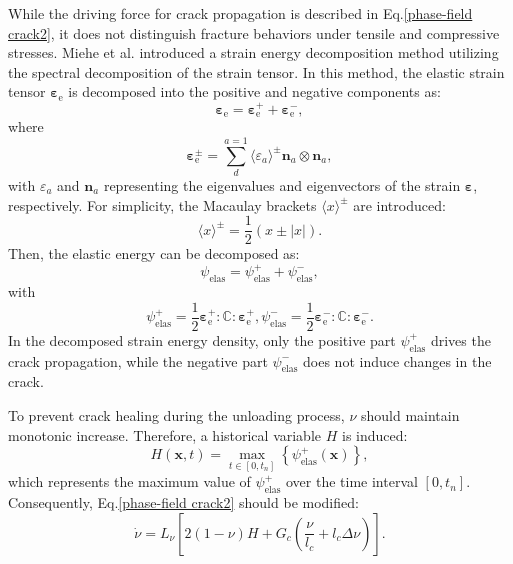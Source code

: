 \documentclass[times,fleqn,11pt]{elsarticle}
\begin{document}
While the driving force for crack propagation is described in Eq.\eqref{phase-field crack2}, it does not distinguish fracture behaviors under tensile and compressive stresses. Miehe et al. \cite{miehe_thermodynamically_2010} introduced a strain energy decomposition method utilizing the spectral decomposition of the strain tensor. In this method, the elastic strain tensor $\mathbf{\varepsilon}_\mathrm{e}$ is decomposed into the positive and negative components as:
\begin{equation}
    \mathbf{\varepsilon}_\mathrm{e}=\mathbf{\varepsilon}^+_\mathrm{e} + \mathbf{\varepsilon}^-_\mathrm{e}  ,
\end{equation}
where 
\begin{equation}
    \mathbf{\varepsilon}_\mathrm{e}^\pm=\sum_{d}^{a=1}\langle \varepsilon_a\rangle^\pm \mathbf{n}_a\otimes\mathbf{n}_a,
\end{equation}
with $\varepsilon_a$ and $\mathbf{n}_a$ representing the eigenvalues and eigenvectors of the strain $\mathbf{\varepsilon}$, respectively. For simplicity, the Macaulay brackets $\langle x \rangle^\pm$ are introduced: 
\begin{equation}
    \langle x \rangle^\pm = \frac{1}{2}(x\pm |x|).
\end{equation}
Then, the elastic energy can be decomposed as:
\begin{equation}
    \psi_\mathrm{elas}=\psi_\mathrm{elas}^++\psi_\mathrm{elas}^-,
\end{equation}
with 
\begin{subequations}
    \begin{equation}
        \psi^+_\mathrm{elas}=\frac{1}{2}\mathbf{\varepsilon}_\mathrm{e}^+ : \mathbb{C} : \mathbf{\varepsilon}_\mathrm{e}^+,
    \end{equation}
    \begin{equation}
        \psi^-_\mathrm{elas}=\frac{1}{2}\mathbf{\varepsilon}_\mathrm{e}^- : \mathbb{C} : \mathbf{\varepsilon}_\mathrm{e}^-.
    \end{equation}
\end{subequations}
In the decomposed strain energy density, only the positive part $\psi^+_\mathrm{elas}$ drives the crack propagation, while the negative part $\psi^-_\mathrm{elas}$ does not induce changes in the crack. 

To prevent crack healing during the unloading process, $\nu$ should maintain monotonic increase. Therefore, a historical variable $H$ is induced:
\begin{equation}
    H(\mathbf{x},t)=\max_{t\in [0,t_n]} \left\{  \psi^+_\mathrm{elas}(\mathbf{x})\right\},
\end{equation}
which represents the maximum value of $\psi^+_\mathrm{elas}$ over the time interval $[0,t_n]$. Consequently, Eq.\eqref{phase-field crack2} should be modified:
\begin{equation}
    \dot{\nu}=L_\nu\left[ 2(1-\nu)H+G_c\left(\frac{\nu}{l_c} + l_c\Delta \nu\right) \right].
\end{equation}
\end{document}
